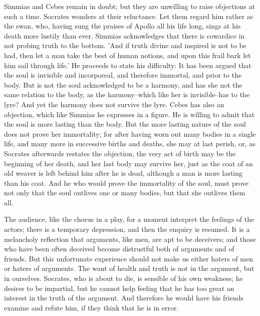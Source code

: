Simmias and Cebes remain in doubt; but they are unwilling to raise
objections at such a time. Socrates wonders at their reluctance. Let
them regard him rather as the swan, who, having sung the praises of
Apollo all his life long, sings at his death more lustily than ever.
Simmias acknowledges that there is cowardice in not probing truth to the
bottom. 'And if truth divine and inspired is not to be had, then let
a man take the best of human notions, and upon this frail bark let him
sail through life.' He proceeds to state his difficulty: It has been
argued that the soul is invisible and incorporeal, and therefore
immortal, and prior to the body. But is not the soul acknowledged to
be a harmony, and has she not the same relation to the body, as the
harmony--which like her is invisible--has to the lyre? And yet the
harmony does not survive the lyre. Cebes has also an objection, which
like Simmias he expresses in a figure. He is willing to admit that the
soul is more lasting than the body. But the more lasting nature of the
soul does not prove her immortality; for after having worn out many
bodies in a single life, and many more in successive births and
deaths, she may at last perish, or, as Socrates afterwards restates the
objection, the very act of birth may be the beginning of her death, and
her last body may survive her, just as the coat of an old weaver is left
behind him after he is dead, although a man is more lasting than his
coat. And he who would prove the immortality of the soul, must prove not
only that the soul outlives one or many bodies, but that she outlives
them all.

The audience, like the chorus in a play, for a moment interpret the
feelings of the actors; there is a temporary depression, and then the
enquiry is resumed. It is a melancholy reflection that arguments, like
men, are apt to be deceivers; and those who have been often deceived
become distrustful both of arguments and of friends. But this
unfortunate experience should not make us either haters of men or haters
of arguments. The want of health and truth is not in the argument, but
in ourselves. Socrates, who is about to die, is sensible of his own
weakness; he desires to be impartial, but he cannot help feeling that he
has too great an interest in the truth of the argument. And therefore he
would have his friends examine and refute him, if they think that he is
in error.


